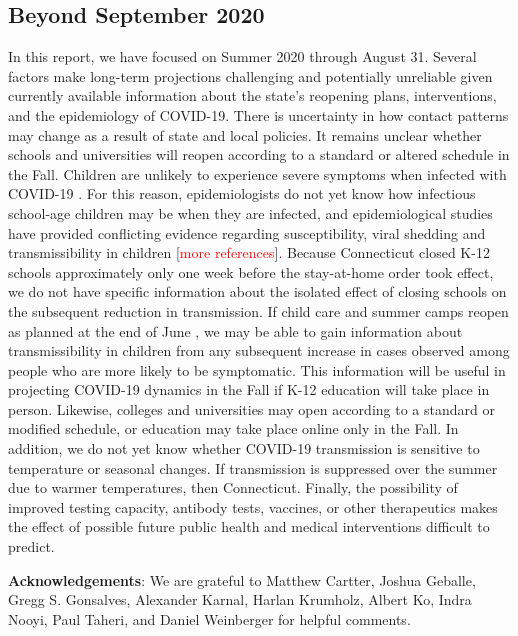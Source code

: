 \documentclass[11pt]{article}
\newcommand{\comment}[1]{[\textcolor{red}{#1}]}
\begin{document}
\subsection*{Beyond September 2020}

In this report, we have focused on Summer 2020 through August 31. Several factors make long-term projections challenging and potentially unreliable given currently available information about the state's reopening plans, interventions, and the epidemiology of COVID-19.  There is uncertainty in how contact patterns may change as a result of state and local policies.  It remains unclear whether schools and universities will reopen according to a standard or altered schedule in the Fall. Children are unlikely to experience severe symptoms when infected with COVID-19 \citep{verity2020estimates, ludvigsson2020systematic}. For this reason, epidemiologists do not yet know how infectious school-age children may be when they are infected, and epidemiological studies have provided conflicting evidence regarding susceptibility, viral shedding and transmissibility in children \citep{lee2020children, viner2020school} \comment{more references}. Because Connecticut closed K-12 schools approximately only one week before the stay-at-home order took effect, we do not have specific information about the isolated effect of closing schools on the subsequent reduction in transmission.  If child care and summer camps reopen as planned at the end of June \citep{dunne2020state}, we may be able to gain information about transmissibility in children from any subsequent increase in cases observed among people who are more likely to be symptomatic.  This information will be useful in projecting COVID-19 dynamics in the Fall if K-12 education will take place in person. Likewise, colleges and universities may open according to a standard or modified schedule, or education may take place online only in the Fall.  In addition, we do not yet know whether COVID-19 transmission is sensitive to temperature or seasonal changes. If transmission is suppressed over the summer due to warmer temperatures, then Connecticut.  Finally, the possibility of improved testing capacity, antibody tests, vaccines, or other therapeutics makes the effect of possible future public health and medical interventions difficult to predict. 




\textbf{Acknowledgements}: We are grateful to
Matthew Cartter,
Joshua Geballe,
Gregg S. Gonsalves,
Alexander Karnal,
Harlan Krumholz,
Albert Ko, 
Indra Nooyi,
Paul Taheri, 
and
Daniel Weinberger
for helpful comments. 





\end{document}
